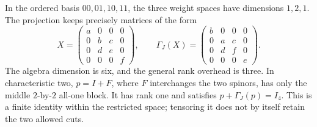 \begin{example}\label{ex:weight-block-one-site}
In the ordered basis \(00,01,10,11\), the three weight spaces have
dimensions \(1,2,1\). The projection keeps precisely matrices of
the form
\[
 X=\begin{pmatrix}
 a&0&0&0\\
 0&b&c&0\\
 0&d&e&0\\
 0&0&0&f
 \end{pmatrix},\qquad
 \Gamma_J(X)=\begin{pmatrix}
 b&0&0&0\\
 0&a&c&0\\
 0&d&f&0\\
 0&0&0&e
 \end{pmatrix}.
\]
The algebra dimension is six, and the general rank overhead is three.
In characteristic two, \(p=I+F\), where \(F\) interchanges the two
spinors, has only the middle \(2\)-by-\(2\) all-one block.
It has rank one and satisfies
\(p+\Gamma_J(p)=I_4\).
This is a finite identity within the restricted space; tensoring it
does not by itself retain the two allowed cuts.
\end{example}


